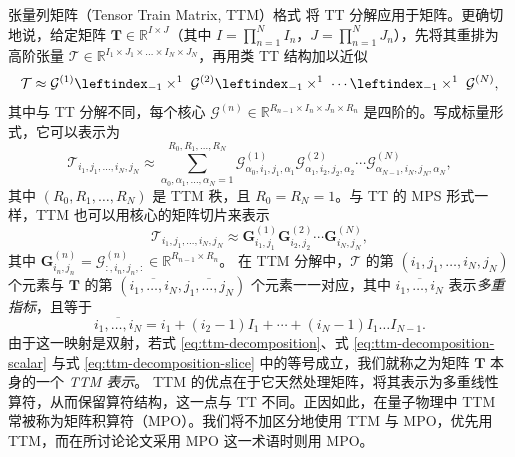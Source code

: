 \documentclass[11pt]{article}
\newcommand{\R}{\mathbb{R}}
\newcommand{\ten}[1]{\mathcal{#1}}
\newcommand{\mat}[1]{\mathbf{#1}}
\begin{document}
张量列矩阵（Tensor Train Matrix, TTM）格式 \cite{oseledets2010ttm} 将 TT 分解应用于矩阵。更确切地说，给定矩阵 $\mat{T}\in\R^{I\times J}$（其中 $I=\prod_{n=1}^N I_n$，$J=\prod_{n=1}^N J_n$），先将其重排为高阶张量 $\ten{T} \in \R^{I_1 \times J_1 \times \dots \times I_N \times J_N}$，再用类 TT 结构加以近似
\begin{equation}
\label{eq:ttm-decomposition}
    \ten{T} \approx \ten{G}^{(1)} \leftindex_{-1} \times^{1} \ \ten{G}^{(2)} \leftindex_{-1} \times^{1} \ \cdots \leftindex_{-1} \times^{1} \ \ten{G}^{(N)},
\end{equation}
其中与 TT 分解不同，每个核心 $\ten{G}^{(n)} \in \R^{R_{n-1} \times I_n \times J_n \times R_n}$ 是四阶的。写成标量形式，它可以表示为
\begin{equation}
\label{eq:ttm-decomposition-scalar}
  \ten{T}_{i_1, j_1,\ldots,i_N ,j_N} \approx \sum_{\alpha_0, \alpha_1, \dots, \alpha_N=1}^{R_0, R_1, \ldots, R_N} \ten{G}^{(1)}_{\alpha_0, i_1, j_1, \alpha_1} \ten{G}^{(2)}_{\alpha_1, i_2, j_2, \alpha_2} \cdots\ten{G}^{(N)}_{\alpha_{N-1},i_N,j_N, \alpha_N},
\end{equation}
其中 $(R_0, R_1, \ldots, R_N)$ 是 TTM 秩，且 $R_0=R_N=1$。与 TT 的 MPS 形式一样，TTM 也可以用核心的矩阵切片来表示
\begin{equation}
\label{eq:ttm-decomposition-slice}
  \ten{T}_{i_1, j_1,\dots, i_N, j_N} \approx \mat{G}^{(1)}_{i_1, j_1}\mat{G}^{(2)}_{i_2, j_2}\cdots\mat{G}^{(N)}_{i_N, j_N},
\end{equation}
其中 $\mat{G}^{(n)}_{i_n, j_n} = \ten{G}^{(n)}_{:, i_n, j_n, :} \in\R^{R_{n-1}\times R_n}$。
在 TTM 分解中，$\ten{T}$ 的第 $(i_1, j_1, \ldots, i_N, j_N)$ 个元素与 $\mat{T}$ 的第 $(\overline{i_1, \ldots, i_N}, \overline{j_1, \ldots, j_N})$ 个元素一一对应，其中 $\overline{i_1, \ldots, i_N}$ 表示\emph{多重指标}，且等于
\begin{equation*}
\overline{i_1, \ldots, i_N} = i_1 + (i_2 - 1)I_1 + \cdots + (i_N - 1)I_1 \ldots I_{N - 1}.
\end{equation*}
由于这一映射是双射，若式 \eqref{eq:ttm-decomposition}、式 \eqref{eq:ttm-decomposition-scalar} 与式 \eqref{eq:ttm-decomposition-slice} 中的等号成立，我们就称之为矩阵 $\mat{T}$ 本身的一个 \emph{TTM 表示}。
TTM 的优点在于它天然处理矩阵，将其表示为多重线性算符，从而保留算符结构，这一点与 TT 不同。正因如此，在量子物理中 TTM 常被称为矩阵积算符（MPO）\cite{schollwock2011dmrg}。我们将不加区分地使用 TTM 与 MPO，优先用 TTM，而在所讨论论文采用 MPO 这一术语时则用 MPO。
\end{document}
